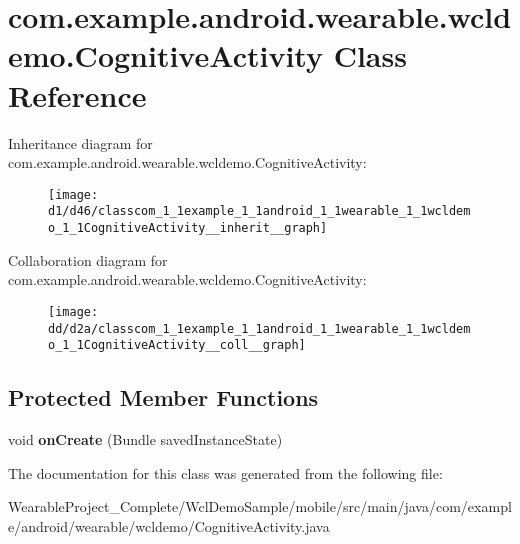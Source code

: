 \hypertarget{classcom_1_1example_1_1android_1_1wearable_1_1wcldemo_1_1CognitiveActivity}{}\section{com.\+example.\+android.\+wearable.\+wcldemo.\+Cognitive\+Activity Class Reference}
\label{classcom_1_1example_1_1android_1_1wearable_1_1wcldemo_1_1CognitiveActivity}


Inheritance diagram for com.\+example.\+android.\+wearable.\+wcldemo.\+Cognitive\+Activity\+:\nopagebreak
\begin{figure}[H]
\begin{center}
\leavevmode
\texttt{[image: d1/d46/classcom\_1\_1example\_1\_1android\_1\_1wearable\_1\_1wcldemo\_1\_1CognitiveActivity\_\_inherit\_\_graph]}
\end{center}
\end{figure}


Collaboration diagram for com.\+example.\+android.\+wearable.\+wcldemo.\+Cognitive\+Activity\+:\nopagebreak
\begin{figure}[H]
\begin{center}
\leavevmode
\texttt{[image: dd/d2a/classcom\_1\_1example\_1\_1android\_1\_1wearable\_1\_1wcldemo\_1\_1CognitiveActivity\_\_coll\_\_graph]}
\end{center}
\end{figure}
\subsection*{Protected Member Functions}
\begin{DoxyCompactItemize}
\item 
void {\bfseries on\+Create} (Bundle saved\+Instance\+State)\hypertarget{classcom_1_1example_1_1android_1_1wearable_1_1wcldemo_1_1CognitiveActivity_aea3968470195eb24274d1db90be34dbd}{}\label{classcom_1_1example_1_1android_1_1wearable_1_1wcldemo_1_1CognitiveActivity_aea3968470195eb24274d1db90be34dbd}

\end{DoxyCompactItemize}


The documentation for this class was generated from the following file\+:\begin{DoxyCompactItemize}
\item 
Wearable\+Project\+\_\+\+Complete/\+Wcl\+Demo\+Sample/mobile/src/main/java/com/example/android/wearable/wcldemo/Cognitive\+Activity.\+java\end{DoxyCompactItemize}
